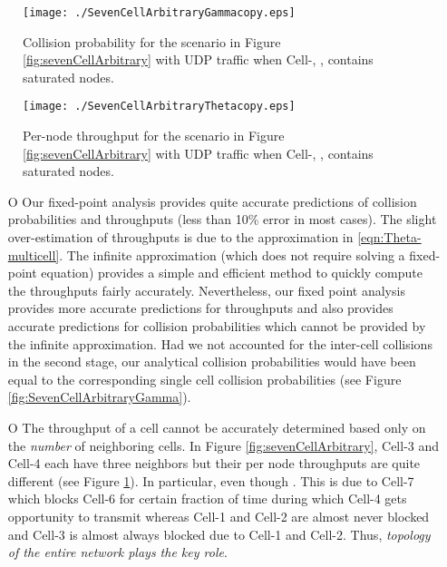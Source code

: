 \documentclass[10pt,a4paper,journal]{IEEEtran}
\theoremstyle{definition}
\theoremstyle{remark}
\theoremstyle{plain}
\begin{document}
\begin{figure}[tb]
\centering
\begin{minipage}{8.25cm}
\begin{center}
\texttt{[image: ./SevenCellArbitraryGammacopy.eps]}
\caption{Collision probability  for the scenario in Figure \ref{fig:sevenCellArbitrary} with UDP traffic when Cell-, , contains  saturated nodes.\label{fig:SevenCellArbitraryGamma}}
\vspace{2mm}
\end{center}
\end{minipage}
\hfill
\begin{minipage}{8.25cm}
\begin{center}
\texttt{[image: ./SevenCellArbitraryThetacopy.eps]}
\caption{Per-node throughput  for the scenario in Figure \ref{fig:sevenCellArbitrary} with UDP traffic when Cell-, , contains  saturated nodes.\label{fig:SevenCellArbitraryTheta}}
\end{center}
\end{minipage}
\end{figure}



\begin{itemize}

\item [O] Our fixed-point analysis provides quite accurate predictions of collision probabilities and throughputs (less than 10\% error in most cases). The slight over-estimation of throughputs is due to the approximation in \eqref{eqn:Theta-multicell}. The infinite  approximation (which does not require solving a fixed-point equation) provides a simple and efficient method to quickly compute the throughputs fairly accurately. Nevertheless, our fixed point analysis provides more accurate predictions for throughputs and also provides accurate predictions for collision probabilities which cannot be provided by the infinite  approximation. Had we not accounted for the inter-cell collisions in the second stage, our analytical collision probabilities would have been equal to the corresponding single cell collision probabilities (see Figure \ref{fig:SevenCellArbitraryGamma}). 

\item [O] The throughput of a cell cannot be accurately determined based only on the \textit{number} of neighboring cells. In Figure \ref{fig:sevenCellArbitrary}, Cell-3 and Cell-4 each have three neighbors but their per node throughputs  are quite different (see Figure \ref{fig:SevenCellArbitraryTheta}). In particular,  even though . This is due to Cell-7 which blocks Cell-6 for certain fraction of time during which Cell-4 gets opportunity to transmit whereas Cell-1 and Cell-2 are almost never blocked and Cell-3 is almost always blocked due to Cell-1 and Cell-2.  Thus, \textit{topology of the entire network plays the key role}. 

\end{itemize}
\end{document}

